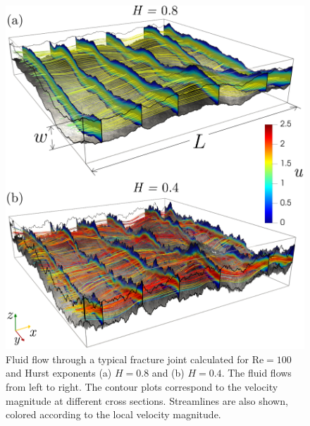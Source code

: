 \documentclass[aps,pre,
superscriptaddress,
twocolumn,
notitlepage,
10pt,
]{revtex4-1}
\begin{document}
\begin{figure} [!ht] 
	\centering 
	\includegraphics[width=1.00\columnwidth]{fig1.png} %
	\caption{Fluid flow through a typical fracture joint calculated for
	$\mathrm{Re}=100$ and Hurst exponents (a) $H=0.8$ and (b) $H=0.4$. The fluid
	flows from left to right. The contour plots correspond to the velocity
	magnitude at different cross sections. Streamlines are also shown, colored
	according to the local velocity magnitude.} \label{fig1}
\end{figure}
\end{document}
